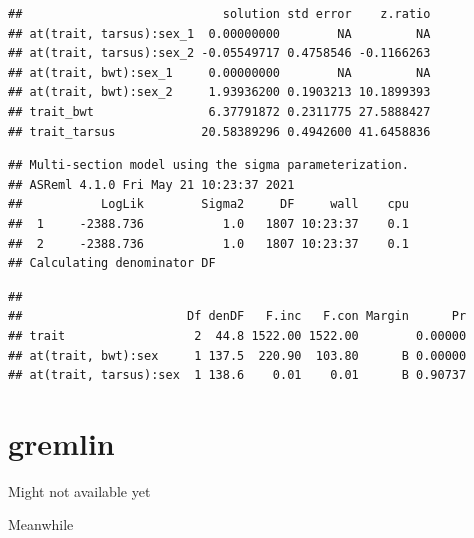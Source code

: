 \documentclass[
  12pt,
]{book}
\newenvironment{Shaded}{\begin{snugshade}}{\end{snugshade}}
\newcommand{\AttributeTok}[1]{\textcolor[rgb]{0.77,0.63,0.00}{#1}}
\newcommand{\ConstantTok}[1]{\textcolor[rgb]{0.00,0.00,0.00}{#1}}
\newcommand{\FunctionTok}[1]{\textcolor[rgb]{0.00,0.00,0.00}{#1}}
\newcommand{\NormalTok}[1]{#1}
\newcommand{\SpecialCharTok}[1]{\textcolor[rgb]{0.00,0.00,0.00}{#1}}
\newcommand{\StringTok}[1]{\textcolor[rgb]{0.31,0.60,0.02}{#1}}
\begin{document}
\begin{Shaded}
\end{Shaded}

\begin{verbatim}
##                            solution std error    z.ratio
## at(trait, tarsus):sex_1  0.00000000        NA         NA
## at(trait, tarsus):sex_2 -0.05549717 0.4758546 -0.1166263
## at(trait, bwt):sex_1     0.00000000        NA         NA
## at(trait, bwt):sex_2     1.93936200 0.1903213 10.1899393
## trait_bwt                6.37791872 0.2311775 27.5888427
## trait_tarsus            20.58389296 0.4942600 41.6458836
\end{verbatim}

\begin{verbatim}
## Multi-section model using the sigma parameterization.
## ASReml 4.1.0 Fri May 21 10:23:37 2021
##           LogLik        Sigma2     DF     wall    cpu
##  1     -2388.736           1.0   1807 10:23:37    0.1
##  2     -2388.736           1.0   1807 10:23:37    0.1
## Calculating denominator DF
\end{verbatim}

\begin{verbatim}
## 
##                       Df denDF   F.inc   F.con Margin      Pr
## trait                  2  44.8 1522.00 1522.00        0.00000
## at(trait, bwt):sex     1 137.5  220.90  103.80      B 0.00000
## at(trait, tarsus):sex  1 138.6    0.01    0.01      B 0.90737
\end{verbatim}

\hypertarget{gremlin-2}{%
\section{gremlin}\label{gremlin-2}}

Might not available yet

Meanwhile
\end{document}
